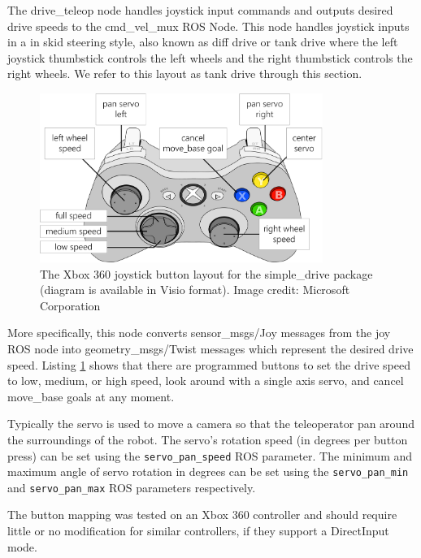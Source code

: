 \documentclass[runningheads,a4paper]{llncs}
\begin{document}
The drive\_teleop node handles joystick input commands and outputs desired drive speeds to the cmd\_vel\_mux ROS Node. This node handles joystick inputs in a in skid steering style, also known as diff drive or tank drive where the left joystick thumbstick controls the left wheels and the right thumbstick controls the right wheels. We refer to this layout as tank drive through this section.

\begin{figure}[H]
\centering
\includegraphics[width=9.2cm]{simple_drive_Xbox_Controller}
\caption{The Xbox 360 joystick button layout for the simple\_drive package (diagram is available in Visio format\protect\footnotemark). Image credit: Microsoft Corporation}
\label{fig:simple_drive_Xbox_Controller}
\end{figure}


More specifically, this node converts sensor\_msgs/Joy messages from the joy ROS node into geometry\_msgs/Twist messages which represent the desired drive speed. Listing \ref{fig:simple_drive_Xbox_Controller} shows that there are programmed buttons to set the drive speed to low, medium, or high speed, look around with a single axis servo, and cancel move\_base goals at any moment. 

Typically the servo is used to move a camera so that the teleoperator pan around the surroundings of the robot. The servo's rotation speed (in degrees per button press) can be set using the \texttt{servo\_pan\_speed} ROS parameter. The minimum and maximum angle of servo rotation in degrees can be set using the \texttt{servo\_pan\_min} and \texttt{servo\_pan\_max} ROS parameters respectively.

The button mapping was tested on an Xbox 360 controller and should require little or no modification for similar controllers, if they support a DirectInput mode.
\end{document}

